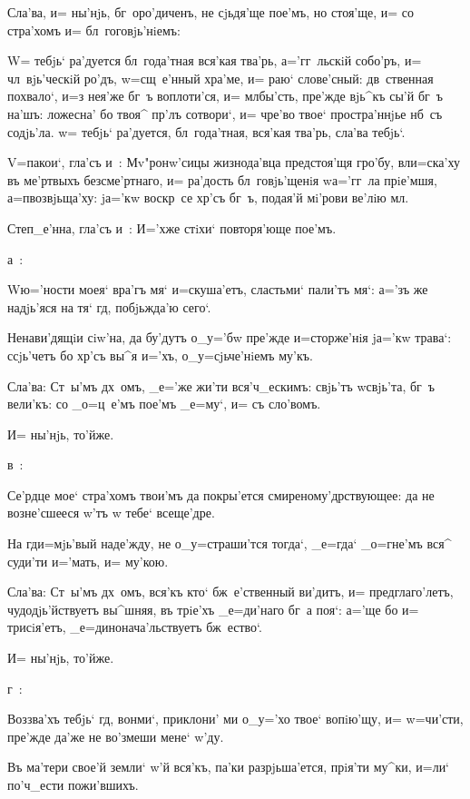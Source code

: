 Сла'ва, и= ны'нjь, бг~оро'диченъ, не сjьдя'ще пое'мъ, 
но стоя'ще, и= со стра'хомъ и= бл~гоговjь'нiемъ:

W= тебjь` ра'дуется бл~года'тная вся'кая тва'рь, 
а='гг~льскiй собо'ръ, и= чл~вjь'ческiй ро'дъ, w=сщ~е'нный 
хра'ме, и= раю` слове'сный: дв~ственная похвало`, и=з\ъ 
нея'же бг~ъ воплоти'ся, и= мл бы'сть, пре'жде 
вjь^къ сы'й бг~ъ на'шъ: ложесна' бо твоя^ пр'лъ 
сотвори`, и= чре'во твое` простра'ннjье нб~съ содjь'ла. 
w= тебjь` ра'дуется, бл~года'тная, вся'кая тва'рь, сла'ва 
тебjь`.

V=пакои`, гла'съ и~: Мv"ронw'сицы жизнода'вца 
предстоя'щя гро'бу, вл и=ска'ху въ ме'ртвыхъ 
безсме'ртнаго, и= ра'дость бл~говjь'щенiя w\т а='гг~ла 
прiе'мшя, а=п возвjьща'ху: jа='кw воскр~се 
хр'съ бг~ъ, подая'й мi'рови ве'лiю мл.

Степ_е'нна, гла'съ и~: И='хже стiхи` повторя'юще 
пое'мъ.

 а~:

W\т ю='ности моея` вра'гъ мя` и=скуша'етъ, сластьми` 
пали'тъ мя`: а='зъ же надjь'яся на тя` гд, побjьжда'ю 
сего`.

Ненави'дящiи сiw'на, да бу'дутъ о_у='бw пре'жде 
и=сторже'нiя jа='кw трава`: ссjь'четъ бо хр'съ вы^я 
и='хъ, о_у=сjьче'нiемъ му'къ.

Сла'ва: Ст~ы'мъ дх~омъ, _е='же жи'ти вся'ч_ескимъ: 
свjь'тъ w\т свjь'та, бг~ъ вели'къ: со _о=ц~е'мъ пое'мъ 
_е=му`, и= съ сло'вомъ.

И= ны'нjь, то'йже.

 в~:

Се'рдце мое` стра'хомъ твои'мъ да покры'ется 
смиреному'дрствующее: да не возне'сшееся w'тъ w\т 
тебе` всеще'дре.

На гд и=мjь'вый наде'жду, не о_у=страши'тся тогда`, 
_е=гда` _о=гне'мъ вся^ суди'ти и='мать, и= му'кою.

Сла'ва: Ст~ы'мъ дх~омъ, вся'къ кто` бж~е'ственный 
ви'дитъ, и= предглаго'летъ, чудодjь'йствуетъ вы^шняя, въ 
трiе'хъ _е=ди'наго бг~а поя`: а='ще бо и= трисiя'етъ, 
_е=динонача'льствуетъ бж~ество`.

И= ны'нjь, то'йже.

 г~:

Воззва'хъ тебjь` гд, вонми`, приклони' ми о_у='хо 
твое` вопiю'щу, и= w=чи'сти, пре'жде да'же не во'змеши 
мене` w'ду.

Въ ма'тери свое'й земли` w'й вся'къ, па'ки 
разрjьша'ется, прiя'ти му^ки, и=ли` по'ч_ести пожи'вшихъ.

